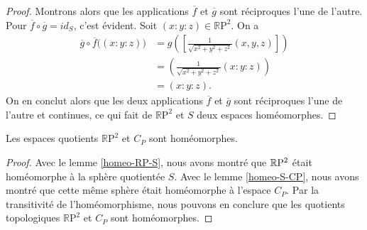\documentclass[hidelinks, 10pt]{article}
\begin{document}
\begin{proof}
Montrons alors que les applications $\overline{f}$ et $\overline{g}$ sont réciproques l'une de l'autre. Pour $\overline{f}\circ \overline{g}=id_{S}$, c'est évident. Soit $(x:y:z)\in\mathbb{R}\mathrm{P}^2$. On a \[\begin{split}
\overline{g}\circ\overline{f}\big((x:y:z)\big)&=g\left(\left[\frac{1}{\sqrt{x^2+y^2+z^2}}(x,y,z)\right]\right)\\
&=\left(\frac{1}{\sqrt{x^2+y^2+z^2}}(x:y:z)\right)\\
&=(x:y:z).
\end{split}\]On en conclut alors que les deux applications $\overline{f}$ et $\overline{g}$ sont réciproques l'une de l'autre et continues, ce qui fait de $\mathbb{R}\mathrm{P}^2$ et $S$ deux espaces homéomorphes.
\end{proof}

\begin{theorem}\label{th:RP2-homeo}
Les espaces quotients $\mathbb{R}\mathrm{P}^2$ et $C_P$ sont homéomorphes.
\end{theorem}
\begin{proof}
Avec le lemme \ref{homeo-RP-S}, nous avons montré que $\mathbb{R}\mathrm{P}^2$ était homéomorphe à la sphère quotientée $S$. Avec le lemme \ref{homeo-S-CP}, nous avons montré que cette même sphère était homéomorphe à l'espace $C_P$. Par la transitivité de l'homéomorphisme, nous pouvons en conclure que les quotients topologiques $\mathbb{R}\mathrm{P}^2$ et $C_P$ sont homéomorphes.
\end{proof}
\end{document}
